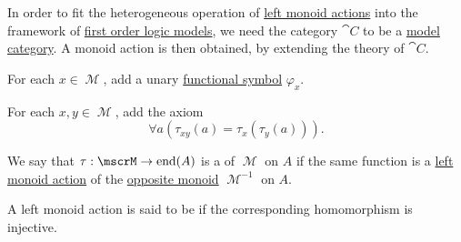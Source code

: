 \begin{remark}\label{rem:theory_of_left_monoid_actions}
  In order to fit the heterogeneous operation of \hyperref[def:left_monoid_action]{left monoid actions} into the framework of \hyperref[def:first_order_semantics/satisfiability]{first order logic models}, we need the category \( \cat{C} \) to be a \hyperref[def:first_order_model_category]{model category}. A monoid action is then obtained, by extending the theory of \( \cat{C} \).

  \begin{thmenum}
     For each \( x \in \mscrM \), add a unary \hyperref[def:first_order_language/func]{functional symbol} \( \varphi_x \).

     For each \( x, y \in \mscrM \), add the axiom
    \begin{equation}\label{eq:rem:theory_of_left_monoid_actions/axiom_schema}
      \forall a (\tau_{xy}(a) = \tau_x(\tau_y(a))).
    \end{equation}
  \end{thmenum}
\end{remark}

\begin{definition}\label{def:right_monoid_action}
  We say that \( \tau: \mscrM \to \End(A) \) is a  of \( \mscrM \) on \( A \) if the same function is a \hyperref[def:left_monoid_action]{left monoid action} of the \hyperref[def:magma/opposite]{opposite monoid} \( \mscrM^{-1} \) on \( A \).
\end{definition}

\begin{definition}\label{def:faithful_left_monoid_action}
  A left monoid action is said to be  if the corresponding homomorphism is injective.
\end{definition}

